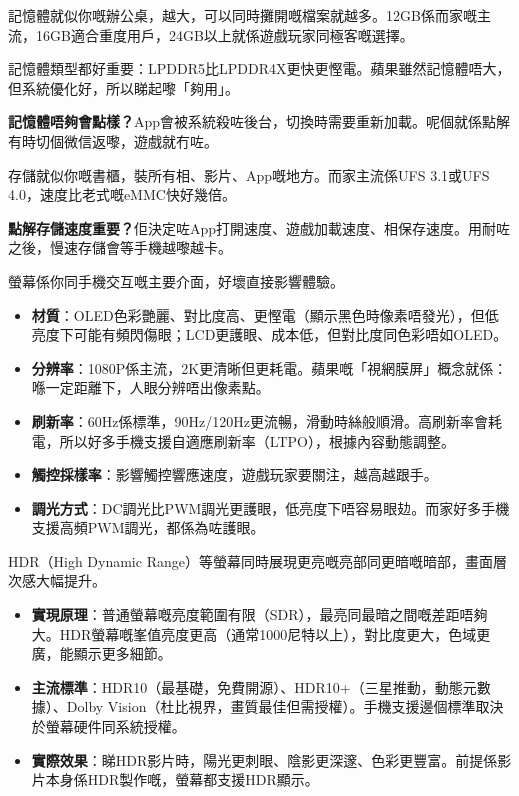 
記憶體就似你嘅辦公桌，越大，可以同時攤開嘅檔案就越多。12GB係而家嘅主流，16GB適合重度用戶，24GB以上就係遊戲玩家同極客嘅選擇。

記憶體類型都好重要：LPDDR5比LPDDR4X更快更慳電。蘋果雖然記憶體唔大，但系統優化好，所以睇起嚟「夠用」。

\textbf{記憶體唔夠會點樣？}App會被系統殺咗後台，切換時需要重新加載。呢個就係點解有時切個微信返嚟，遊戲就冇咗。


存儲就似你嘅書櫃，裝所有相、影片、App嘅地方。而家主流係UFS 3.1或UFS 4.0，速度比老式嘅eMMC快好幾倍。

\textbf{點解存儲速度重要？}佢決定咗App打開速度、遊戲加載速度、相保存速度。用耐咗之後，慢速存儲會等手機越嚟越卡。


螢幕係你同手機交互嘅主要介面，好壞直接影響體驗。

\begin{itemize}
  \item \textbf{材質}：OLED色彩艷麗、對比度高、更慳電（顯示黑色時像素唔發光），但低亮度下可能有頻閃傷眼；LCD更護眼、成本低，但對比度同色彩唔如OLED。
  \item \textbf{分辨率}：1080P係主流，2K更清晰但更耗電。蘋果嘅「視網膜屏」概念就係：喺一定距離下，人眼分辨唔出像素點。
  \item \textbf{刷新率}：60Hz係標準，90Hz/120Hz更流暢，滑動時絲般順滑。高刷新率會耗電，所以好多手機支援自適應刷新率（LTPO），根據內容動態調整。
  \item \textbf{觸控採樣率}：影響觸控響應速度，遊戲玩家要關注，越高越跟手。
  \item \textbf{調光方式}：DC調光比PWM調光更護眼，低亮度下唔容易眼攰。而家好多手機支援高頻PWM調光，都係為咗護眼。
\end{itemize}


HDR（High Dynamic Range）等螢幕同時展現更亮嘅亮部同更暗嘅暗部，畫面層次感大幅提升。

\begin{itemize}
  \item \textbf{實現原理}：普通螢幕嘅亮度範圍有限（SDR），最亮同最暗之間嘅差距唔夠大。HDR螢幕嘅峯值亮度更高（通常1000尼特以上），對比度更大，色域更廣，能顯示更多細節。
  \item \textbf{主流標準}：HDR10（最基礎，免費開源）、HDR10+（三星推動，動態元數據）、Dolby Vision（杜比視界，畫質最佳但需授權）。手機支援邊個標準取決於螢幕硬件同系統授權。
  \item \textbf{實際效果}：睇HDR影片時，陽光更刺眼、陰影更深邃、色彩更豐富。前提係影片本身係HDR製作嘅，螢幕都支援HDR顯示。
\end{itemize}

